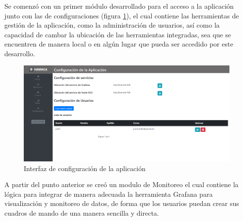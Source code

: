 Se comenzó con un primer módulo desarrollado para el acceso a la aplicación 
junto con las de configuraciones (figura \ref{fig:hamaca_config}), el cual contiene las herramientas de gestión de la aplicación, como la administración de usuarios, así como la capacidad de cambar la ubicación de las herramientas integradas, sea que se encuentren de manera local o en algún lugar que pueda ser accedido por este desarrollo.\\

\begin{figure}[htb]
\centering
\includegraphics[scale=0.225]{./Figuras/hamaca_config.png}
\caption{Interfaz de configuración de la aplicación}
\label{fig:hamaca_config}
\vspace*{-10pt}
\end{figure}

A partir del punto anterior se creó un modulo de Monitoreo el cual contiene la lógica para integrar de manera adecuada la herramienta Grafana para visualización y monitoreo de datos, de forma que los usuarios puedan crear sus cuadros de mando de una manera sencilla y directa.\\ %



